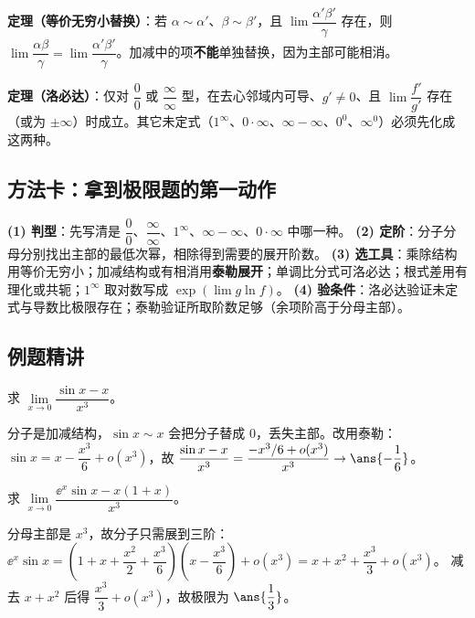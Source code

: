 \noindent\textbf{定理（等价无穷小替换）}：若 $\alpha\sim\alpha'$、$\beta\sim\beta'$，且 $\lim\dfrac{\alpha'\beta'}{\gamma}$ 存在，则 $\lim\dfrac{\alpha\beta}{\gamma}=\lim\dfrac{\alpha'\beta'}{\gamma}$。加减中的项\textbf{不能}单独替换，因为主部可能相消。

\noindent\textbf{定理（洛必达）}：仅对 $\dfrac00$ 或 $\dfrac{\infty}{\infty}$ 型，在去心邻域内可导、$g'\ne0$、且 $\lim\dfrac{f'}{g'}$ 存在（或为 $\pm\infty$）时成立。其它未定式（$1^\infty$、$0\cdot\infty$、$\infty-\infty$、$0^0$、$\infty^0$）必须先化成这两种。

\subsection{方法卡：拿到极限题的第一动作}

\begin{keypoint}[四步定工具]
\textbf{(1) 判型}：先写清是 $\dfrac00$、$\dfrac{\infty}{\infty}$、$1^\infty$、$\infty-\infty$、$0\cdot\infty$ 中哪一种。
\textbf{(2) 定阶}：分子分母分别找出主部的最低次幂，相除得到需要的展开阶数。
\textbf{(3) 选工具}：乘除结构用等价无穷小；加减结构或有相消用\textbf{泰勒展开}；单调比分式可洛必达；根式差用有理化或共轭；$1^\infty$ 取对数写成 $\exp(\lim g\ln f)$。
\textbf{(4) 验条件}：洛必达验证未定式与导数比极限存在；泰勒验证所取阶数足够（余项阶高于分母主部）。
\end{keypoint}

\subsection{例题精讲}

\begin{exa}
求 $\lim\limits_{x\to0}\dfrac{\sin x-x}{x^3}$。
\end{exa}
\begin{solution}
分子是加减结构，$\sin x\sim x$ 会把分子替成 $0$，丢失主部。改用泰勒：$\sin x=x-\dfrac{x^3}{6}+o(x^3)$，故
$\dfrac{\sin x-x}{x^3}=\dfrac{-x^3/6+o(x^3)}{x^3}\to\ans{-\dfrac16}$。
\end{solution}

\begin{exa}[乘积展开确定阶数]
求 $\lim\limits_{x\to0}\dfrac{\ee^x\sin x-x(1+x)}{x^3}$。
\end{exa}
\begin{solution}
分母主部是 $x^3$，故分子只需展到三阶：
$\ee^x\sin x=\left(1+x+\dfrac{x^2}{2}+\dfrac{x^3}{6}\right)\left(x-\dfrac{x^3}{6}\right)+o(x^3)
=x+x^2+\dfrac{x^3}{3}+o(x^3)$。
减去 $x+x^2$ 后得 $\dfrac{x^3}{3}+o(x^3)$，故极限为 $\ans{\dfrac13}$。
\end{solution}

